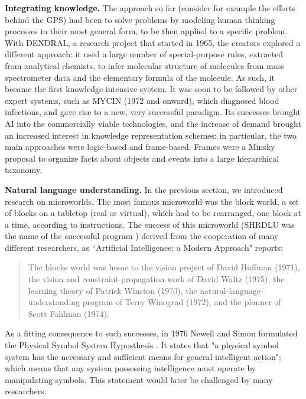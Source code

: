 \documentclass[../main.tex]{subfiles}
\begin{document}
\vspace{4pt}
\textbf{Integrating knowledge.}
The approach so far (consider for example the efforts behind the GPS) had been to solve problems by modeling human thinking processes in their most general form, to be then applied to a specific problem. With DENDRAL, a research project that started in 1965, the creators explored a different approach: it used a large number of special-purpose rules, extracted from analytical chemists, to infer molecular structure of molecules from mass spectrometer data and the elementary formula of the molecule. As such, it became the first knowledge-intensive system.
It was soon to be followed by other expert systems, such as MYCIN (1972 and onward\cite{MYCINArtificialIntelligence}), which diagnosed blood infections, and gave rise to a new, very successful paradigm. Its successes brought AI into the commercially viable technologies, and the increase of demand brought an increased interest in knowledge representation schemes: in particular, the two main approaches were logic-based and frame-based. Frames were a Minsky proposal\cite{minskyFrameworkRepresentingKnowledge1975} to organize facts about objects and events into a large hierarchical taxonomy.

\vspace{4pt}
\textbf{Natural language understanding.}
In the previous section, we introduced research on microworlds.
The most famous microworld was the block world, a set of blocks on a tabletop (real or virtual), which had to be rearranged, one block at a time, according to instructions. The success of this microworld (SHRDLU was the name of the successful program \cite{winogradProceduresRepresentationData1971}) derived from the cooperation of many different researchers, as ``Artificial Intelligence: a Modern Approach" reports:

\begin{quote}
    The blocks world was home to the vision project of David Huffman (1971), the vision and constraint-propagation work of David Waltz (1975), the learning theory of Patrick Winston (1970), the natural-language-understanding program of Terry Winograd (1972), and the planner of Scott Fahlman (1974).
\end{quote}\cite{russellArtificialIntelligenceModern2002}
As a fitting consequence to such successes, in 1976 Newell and Simon formulated the Physical Symbol System Hyposthesis \cite{newellComputerScienceEmpirical1976}. It states that "a physical symbol system has the necessary and sufficient means for general intelligent action"; which means that any system possessing intelligence must operate by manipulating symbols. This statement would later be challenged by many researchers.
\end{document}
